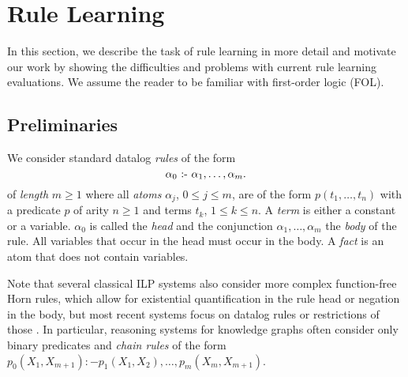 \section{Rule Learning}\label{sec:motivation}

In this section, we describe the task of rule learning in more detail and motivate our work by showing the difficulties and problems with current rule learning evaluations.
We assume the reader to be familiar with first-order logic (FOL). 

\subsection{Preliminaries}

We consider standard datalog \emph{rules} of the form 
\begin{equation}\label{eq:rule}
    \alpha_0\text{ :- }\alpha_1,\dots,\alpha_m .
\end{equation}
of \emph{length} $m\ge1$ where all \emph{atoms} $\alpha_j$, $0\le j\le m$, are of the form $p(t_1,\dots,t_n)$ with a {predicate} $p$ of arity $n\ge1$ and terms $t_k$, $1\le k\le n$.
A \emph{term} is either a constant or a variable. 
$\alpha_0$ is called the \emph{head} and the conjunction $\alpha_1,\dots,\alpha_m$ the \emph{body} of the rule. All variables that occur in the head must occur in the body. A \emph{fact} is an atom that does not contain variables.

Note that several classical ILP systems also consider more complex function-free Horn rules, which allow for existential quantification in the rule head or negation in the body, but most recent systems focus on datalog rules or restrictions of those \cite{Galarraga+-VLDBJ15:amiep,EGre-jair18:learning-explanatory-rules,RoR-NIPS17}. In particular, reasoning systems for knowledge graphs \cite{YaYaCo-NIPS17:neurallp,OWaWa-IJCAI18:scalable-rule-learning}
often consider only binary predicates and \emph{chain rules} %
of the form
$p_0(X_1,X_{m+1}):-p_1(X_1,X_2),\dots,p_{m}(X_{m},X_{m+1})$.


